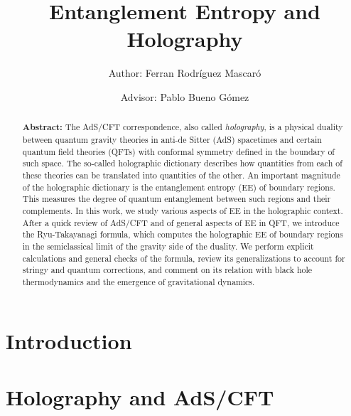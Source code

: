 \documentclass[twocolumn]{revtex4}
\begin{document}
\pagestyle{fancy}


\title{Entanglement Entropy and Holography}
\author{Author: Ferran Rodríguez Mascaró}
\author{Advisor: Pablo Bueno Gómez}


\begin{abstract}
    {\bf Abstract:} The AdS/CFT correspondence, also called \textit{holography}, is a physical duality between quantum gravity theories in anti-de Sitter (AdS) spacetimes and certain quantum field theories (QFTs) with conformal symmetry defined in the boundary of such space. The so-called holographic dictionary describes how quantities from each of these theories can be translated into quantities of the other. An important magnitude of the holographic dictionary is the entanglement entropy (EE) of boundary regions. This measures the degree of quantum entanglement between such regions and their complements. In this work, we study various aspects of EE in the holographic context. After a quick review of AdS/CFT and of general aspects of EE in QFT, we introduce the Ryu-Takayanagi formula, which computes the holographic EE of boundary regions in the semiclassical limit of the gravity side of the duality. We perform explicit calculations and general checks of the formula, review its generalizations to account for stringy and quantum corrections, and comment on its relation with black hole thermodynamics and the emergence of gravitational dynamics.
\end{abstract}


\maketitle


\section{Introduction} \label{s:Intro}






\newpage


\section{Holography and AdS/CFT}
\end{document}
